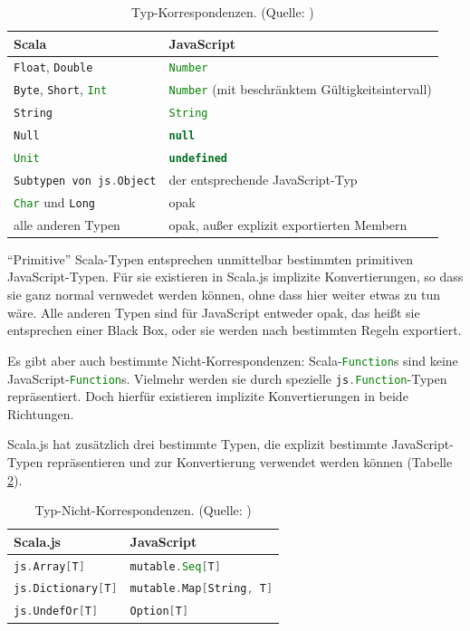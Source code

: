 \documentclass[a4paper, 12pt, hidelinks, listof=totoc, listoftables=totoc, bibliography=totoc]{scrreprt}
\newcommand{\scala}[1]{\lstinline[language=Scala, style=inline]|#1|}
\newcommand{\js}[1]{\lstinline[language=JavaScript, style=inline]|#1|}
\begin{document}
\begin{table}[!h]
\begin{tabular}{|l|l|}
\hline \textbf{Scala}                           & \textbf{JavaScript} \\ 
\hline \scala{Float}, \scala{Double}            & \js{Number} \\ 
\hline \scala{Byte}, \scala{Short}, \scala{Int} & \js{Number} (mit beschränktem Gültigkeitsintervall) \\ 
\hline \scala{String}                           & \js{String} \\ 
\hline \scala{Null}                             & \js{null} \\ 
\hline \scala{Unit}                             & \js{undefined} \\ 
\hline \scala{Subtypen von js.Object}           & der entsprechende JavaScript-Typ \\ 
\hline \scala{Char} und \scala{Long}            & opak \\ 
\hline alle anderen Typen                       & opak, außer explizit exportierten Membern \\ 
\hline 
\end{tabular}
\caption{Typ-Korrespondenzen. (Quelle: \cite[S. 13]{doeraene2014.WHB})}
\label{table:type-correspondance}
\end{table}

\medskip

"`Primitive"' Scala-Typen entsprechen unmittelbar bestimmten primitiven JavaScript-Typen. Für sie existieren in Scala.js implizite Konvertierungen, so dass sie ganz normal vernwedet werden können, ohne dass hier weiter etwas zu tun wäre. Alle anderen Typen sind für JavaScript entweder opak, das heißt sie entsprechen einer Black Box, oder sie werden nach bestimmten Regeln exportiert.

Es gibt aber auch bestimmte Nicht-Korrespondenzen: Scala-\scala{Function}s sind keine JavaScript-\js{Function}s. Vielmehr werden sie durch spezielle \scala{js.Function}-Typen repräsentiert. Doch hierfür existieren implizite Konvertierungen in beide Richtungen.

Scala.js hat zusätzlich drei bestimmte Typen, die explizit bestimmte JavaScript-Typen repräsentieren und zur Konvertierung verwendet werden können (Tabelle \ref{table:type-non-correspondance}).

\medskip

\begin{table}[!h]
\begin{tabular}{|l|l|}
\hline \textbf{Scala.js} & \textbf{JavaScript} \\ 
\hline \scala{js.Array[T]}      & \scala{mutable.Seq[T]} \\ 
\hline \scala{js.Dictionary[T]} & \scala{mutable.Map[String, T]} \\ 
\hline \scala{js.UndefOr[T]}    & \scala{Option[T]} \\ 
\hline 
\end{tabular}
\caption{Typ-Nicht-Korrespondenzen. (Quelle: \cite{scalajs.DJI})}
\label{table:type-non-correspondance}
\end{table}
\end{document}
